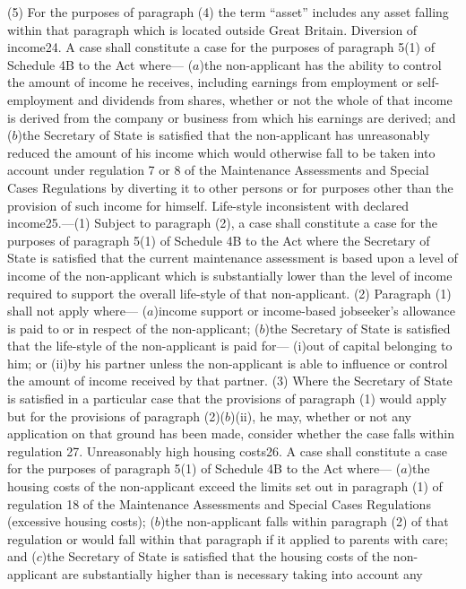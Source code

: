 \documentclass[a4paper]{article}
\begin{document}
(5) For the purposes of paragraph (4) the term “asset” includes any asset
falling within that paragraph which is located outside Great Britain.
Diversion of income24. A case shall constitute a case for the purposes of
paragraph 5(1) of Schedule 4B to the Act where—
($a$)the non-applicant has the ability to control the amount of income he
receives, including earnings from employment or self-employment and dividends
from shares, whether or not the whole of that income is derived from the company
or business from which his earnings are derived; and
($b$)the Secretary of State is satisfied that the non-applicant has unreasonably
reduced the amount of his income which would otherwise fall to be taken into
account under regulation 7 or 8 of the Maintenance Assessments and Special Cases
Regulations by diverting it to other persons or for purposes other than the
provision of such income for himself.
Life-style inconsistent with declared income25.—(1) Subject to paragraph (2), a
case shall constitute a case for the purposes of paragraph 5(1) of Schedule 4B
to the Act where the Secretary of State is satisfied that the current
maintenance assessment is based upon a level of income of the non-applicant
which is substantially lower than the level of income required to support the
overall life-style of that non-applicant.
(2) Paragraph (1) shall not apply where—
($a$)income support or income-based jobseeker’s allowance is paid to or in respect
of the non-applicant;
($b$)the Secretary of State is satisfied that the life-style of the non-applicant
is paid for—
(i)out of capital belonging to him; or
(ii)by his partner unless the non-applicant is able to influence or control the
amount of income received by that partner.
(3) Where the Secretary of State is satisfied in a particular case that the
provisions of paragraph (1) would apply but for the provisions of paragraph
(2)($b$)(ii), he may, whether or not any application on that ground has been made,
consider whether the case falls within regulation 27.
Unreasonably high housing costs26. A case shall constitute a case for the
purposes of paragraph 5(1) of Schedule 4B to the Act where—
($a$)the housing costs of the non-applicant exceed the limits set out in paragraph
(1) of regulation 18 of the Maintenance Assessments and Special Cases
Regulations (excessive housing costs);
($b$)the non-applicant falls within paragraph (2) of that regulation or would fall
within that paragraph if it applied to parents with care; and
($c$)the Secretary of State is satisfied that the housing costs of the
non-applicant are substantially higher than is necessary taking into account any
\end{document}
